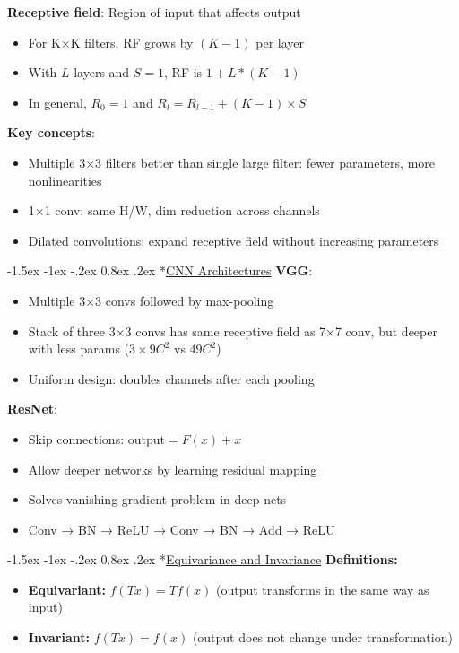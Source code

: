 \documentclass{article}
\makeatletter
\renewcommand\section{\@startsection{section}{1}{\z@}%
                                  {-1.5ex \@plus -1ex \@minus -.2ex}%
                                  {0.8ex \@plus.2ex}%
                                  {\normalfont\small\bfseries}}
\makeatother
\begin{document}
\begin{multicols}{3}
\textbf{Receptive field}: Region of input that affects output
\begin{itemize}
\item For K×K filters, RF grows by $(K-1)$ per layer
\item With $L$ layers and $S=1$, RF is $1 + L * (K - 1)$
\item In general, $R_0 = 1$ and $R_l = R_{l-1} + (K-1) \times S$
\end{itemize}

\textbf{Key concepts}:
\begin{itemize}
\item Multiple 3×3 filters better than single large filter: fewer parameters, more nonlinearities
\item 1×1 conv: same H/W, dim reduction across channels
\item Dilated convolutions: expand receptive field without increasing parameters
\end{itemize}

\section*{\underline{CNN Architectures}}
\textbf{VGG}:
\begin{itemize}
\item Multiple 3×3 convs followed by max-pooling
\item Stack of three 3×3 convs has same receptive field as 7×7 conv, but deeper with less params ($3\times 9C^2$ vs $49C^2$)
\item Uniform design: doubles channels after each pooling
\end{itemize}

\textbf{ResNet}:
\begin{itemize}
\item Skip connections: $\text{output} = F(x) + x$
\item Allow deeper networks by learning residual mapping
\item Solves vanishing gradient problem in deep nets
\item Conv → BN → ReLU → Conv → BN → Add → ReLU
\end{itemize}

\section*{\underline{Equivariance and Invariance}}
\textbf{Definitions:}
\begin{itemize}
  \item \textbf{Equivariant:} $f(Tx) = T f(x)$\hspace{0.5em} (output transforms in the same way as input)
  \item \textbf{Invariant:} $f(Tx) = f(x)$\hspace{0.5em} (output does not change under transformation)
\end{itemize}


\end{multicols}
\end{document}
